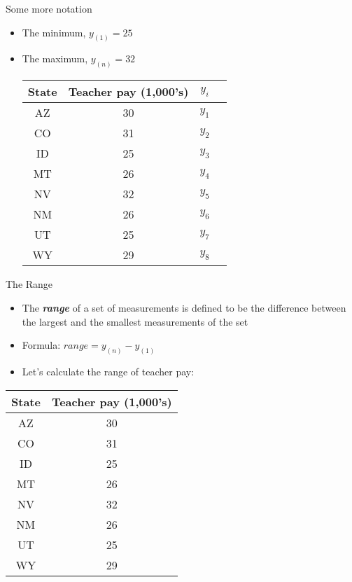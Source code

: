 \documentclass[xcolor=dvipsnames]{beamer}
\begin{document}
\begin{frame}{Some more notation}
	\vspace{-5pt}
	\begin{itemize}
		\item The minimum, $y_{(1)} = 25$ 
		\item The maximum, $y_{(n)} = 32$ 
		\vspace{5 pt}
		\begin{center}
			\begin{tabular}{|c|c|c|c|}
				\hline 
				\textbf{State} & \textbf{Teacher pay (1,000's)} & $y_i$ \\ 
				\hline \hline
				AZ & 30 & $y_1$\\ \hline 
				CO &  31 & $y_2$ \\ \hline 
				ID & 25 & $y_3$ \\  \hline 
				MT &  26 & $y_4$ \\ \hline 
				NV & 32 & $y_5$ \\ \hline 
				NM &  26 & $y_6$\\ \hline 
				UT &  25 & $y_7$\\ \hline 
				WY &  29 & $y_8$\\ \hline 
			\end{tabular} 
		\end{center}
	\end{itemize}
\end{frame}

\begin{frame}{The Range}
	\begin{itemize}
		\item The \textbf{\emph{range}} of a set of measurements is defined to be the difference between the largest and the smallest measurements of the set \pause
		\item Formula: $range = y_{(n)} - y_{(1)}$ \pause
		\item Let's calculate the range of teacher pay: 
	\end{itemize}
	\begin{center}
		\begin{tabular}{|c|c|}
			\hline 
			\textbf{State} & \textbf{Teacher pay (1,000's)} \\ 
			\hline \hline
			AZ & 30 \\ \hline 
			CO &  31 \\ \hline 
			ID & 25  \\  \hline 
			MT &  26 \\ \hline 
			NV & 32 \\ \hline 
			NM &  26 \\ \hline 
			UT &  25 \\ \hline 
			WY &  29 \\ \hline 
		\end{tabular} 
	\end{center}
\end{frame}
\end{document}
